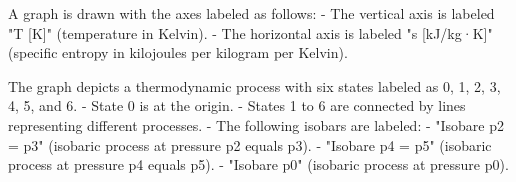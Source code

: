 A graph is drawn with the axes labeled as follows:  
- The vertical axis is labeled "T [K]" (temperature in Kelvin).  
- The horizontal axis is labeled "s [kJ/kg·K]" (specific entropy in kilojoules per kilogram per Kelvin).  

The graph depicts a thermodynamic process with six states labeled as 0, 1, 2, 3, 4, 5, and 6.  
- State 0 is at the origin.  
- States 1 to 6 are connected by lines representing different processes.  
- The following isobars are labeled:  
  - "Isobare p2 = p3" (isobaric process at pressure p2 equals p3).  
  - "Isobare p4 = p5" (isobaric process at pressure p4 equals p5).  
  - "Isobare p0" (isobaric process at pressure p0).